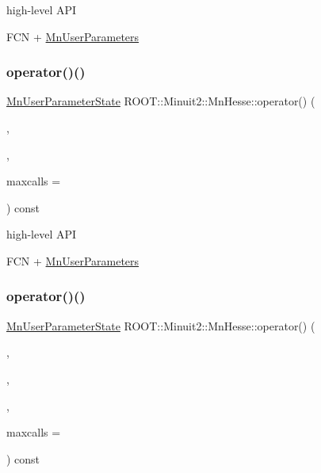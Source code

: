 high-\/level A\+PI

F\+CN + \mbox{\hyperlink{classROOT_1_1Minuit2_1_1MnUserParameters}{Mn\+User\+Parameters}} \mbox{\label{classROOT_1_1Minuit2_1_1MnHesse_ab7a2674f254e7f6056885d7d792ea671}} 
\subsubsection{\texorpdfstring{operator()()}{operator()()}\hspace{0.1cm}{\footnotesize\ttfamily [8/16]}}
{\footnotesize\ttfamily \mbox{\hyperlink{classROOT_1_1Minuit2_1_1MnUserParameterState}{Mn\+User\+Parameter\+State}} R\+O\+O\+T\+::\+Minuit2\+::\+Mn\+Hesse\+::operator() (\begin{DoxyParamCaption}\item[{const \mbox{\hyperlink{classROOT_1_1Minuit2_1_1FCNBase}{F\+C\+N\+Base}} \&}]{,  }\item[{const \mbox{\hyperlink{classROOT_1_1Minuit2_1_1MnUserParameters}{Mn\+User\+Parameters}} \&}]{,  }\item[{unsigned int}]{maxcalls = {} }\end{DoxyParamCaption}) const}

high-\/level A\+PI

F\+CN + \mbox{\hyperlink{classROOT_1_1Minuit2_1_1MnUserParameters}{Mn\+User\+Parameters}} \mbox{\label{classROOT_1_1Minuit2_1_1MnHesse_aeba6a2c85b9bda7785d418a6e2605722}} 
\subsubsection{\texorpdfstring{operator()()}{operator()()}\hspace{0.1cm}{\footnotesize\ttfamily [9/16]}}
{\footnotesize\ttfamily \mbox{\hyperlink{classROOT_1_1Minuit2_1_1MnUserParameterState}{Mn\+User\+Parameter\+State}} R\+O\+O\+T\+::\+Minuit2\+::\+Mn\+Hesse\+::operator() (\begin{DoxyParamCaption}\item[{const \mbox{\hyperlink{classROOT_1_1Minuit2_1_1FCNBase}{F\+C\+N\+Base}} \&}]{,  }\item[{const \mbox{\hyperlink{classROOT_1_1Minuit2_1_1MnUserParameters}{Mn\+User\+Parameters}} \&}]{,  }\item[{const \mbox{\hyperlink{classROOT_1_1Minuit2_1_1MnUserCovariance}{Mn\+User\+Covariance}} \&}]{,  }\item[{unsigned int}]{maxcalls = {} }\end{DoxyParamCaption}) const}



